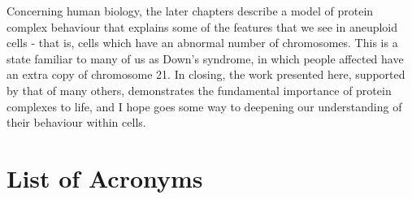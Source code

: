 \documentclass[a4paper,11pt,twoside,openright]{scrbook}
\begin{document}
Concerning human biology, the later chapters describe a model of protein complex behaviour that explains some of the features that we see in aneuploid cells - that is, cells which have an abnormal number of chromosomes. This is a state familiar to many of us as Down's syndrome, in which people affected have an extra copy of chromosome 21. In closing, the work presented here, supported by that of many others, demonstrates the fundamental importance of protein complexes to life, and I hope goes some way to deepening our understanding of their behaviour within cells.


\clearpage
\tableofcontents
{}

\clearpage
\listoffigures
{}

\clearpage
\listoftables
{}
\clearpage

\chapter*{List of Acronyms}
\end{document}

